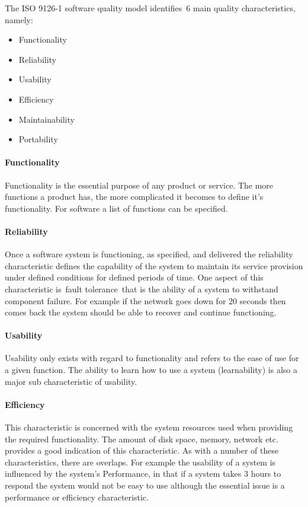 \documentclass{template/openetcs_article}
\begin{document}
The ISO 9126-1 software quality model identifies~6 main quality characteristics, namely:
\begin{itemize}
\item Functionality
\item Reliability
\item Usability
\item Efficiency
\item Maintainability
\item Portability
\end{itemize}


\paragraph{Functionality}

Functionality is the essential purpose of any product or service. The more functions a product has, the more complicated it becomes to define it's functionality. For software a list of functions can be specified.


\paragraph{Reliability}

Once a software system is functioning, as specified, and delivered the reliability characteristic defines the capability of the system to maintain its service provision under defined conditions for defined periods of time. One aspect of this characteristic is~fault tolerance~that is the ability of a system to withstand component failure. For example if the network goes down for 20 seconds then comes back the system should be able to recover and continue functioning.~

\paragraph{Usability}
Usability only exists with regard to functionality and refers to the ease of use for a given function. The ability to learn how to use a system (learnability) is also a major sub characteristic of usability.~


\paragraph{Efficiency}

This characteristic is concerned with the system resources used when providing the required functionality. The amount of disk space, memory, network etc. provides a good indication of this characteristic. As with a number of these characteristics, there are overlaps. For example the usability of a system is influenced by the system's Performance, in that if a system takes 3 hours to respond the system would not be easy to use although the essential issue is a performance or efficiency characteristic.
\end{document}
